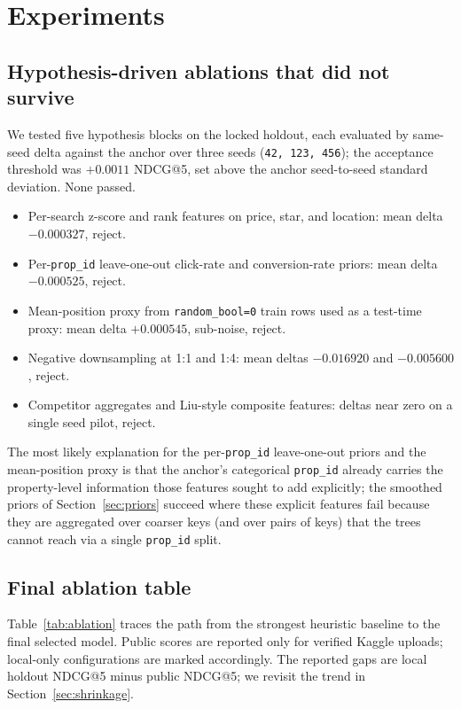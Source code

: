 \documentclass[runningheads]{llncs}
\begin{document}
\section{Experiments}
\label{sec:experiments}

\subsection{Hypothesis-driven ablations that did not survive}
\label{sec:exp-rejected}

We tested five hypothesis blocks on the locked holdout, each
evaluated by same-seed delta against the anchor over three seeds
(\texttt{42, 123, 456}); the acceptance threshold was
$+0.0011$ NDCG@5, set above the anchor seed-to-seed standard
deviation. None passed.

\begin{itemize}
\item Per-search z-score and rank features on price, star, and
    location: mean delta $-0.000327$, reject.
\item Per-\texttt{prop\_id} leave-one-out click-rate and
    conversion-rate priors: mean delta $-0.000525$, reject.
\item Mean-position proxy from \texttt{random\_bool=0} train rows
    used as a test-time proxy: mean delta $+0.000545$, sub-noise,
    reject.
\item Negative downsampling at 1:1 and 1:4: mean deltas
    $-0.016920$ and $-0.005600$, reject.
\item Competitor aggregates and Liu-style composite features:
    deltas near zero on a single seed pilot, reject.
\end{itemize}

The most likely explanation for the per-\texttt{prop\_id} leave-one-out
priors and the mean-position proxy is that the anchor's categorical
\texttt{prop\_id} already carries the property-level information those
features sought to add explicitly; the smoothed priors of
Section~\ref{sec:priors} succeed where these explicit features fail
because they are aggregated over coarser keys (and over pairs of keys)
that the trees cannot reach via a single \texttt{prop\_id} split.

\subsection{Final ablation table}
\label{sec:exp-ablation}


Table~\ref{tab:ablation} traces the path from the strongest heuristic
baseline to the final selected model. Public scores are reported
only for verified Kaggle uploads; local-only configurations are
marked accordingly. The reported gaps are local holdout NDCG@5
minus public NDCG@5; we revisit the trend in
Section~\ref{sec:shrinkage}.
\end{document}

